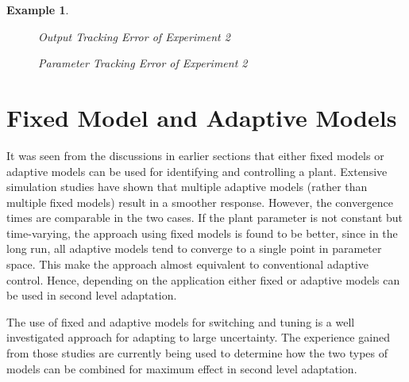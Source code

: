 \documentclass[conference]{IEEEtran}
\newtheorem{Example}{Example}
\begin{document}
\begin{Example}
\begin{figure}[H]
\centering
{}
\caption{Output Tracking Error of Experiment 2}
\end{figure}

\begin{figure}[H]
\centering
{}
\caption{Parameter Tracking Error of Experiment 2}
\end{figure}



\end{Example}




\section{Fixed Model and Adaptive Models}
It was seen from the discussions in earlier sections that either fixed models or adaptive models can be used for identifying and controlling a plant. Extensive simulation studies have shown that multiple adaptive models (rather than multiple fixed models) result in a smoother response. However, the convergence times are comparable in the two cases. If the plant parameter is not constant but time-varying, the approach using fixed models is found to be better, since in the long run, all adaptive models tend to converge to a single point in parameter space. This make the approach almost equivalent to conventional adaptive control. Hence, depending on the application either fixed or adaptive models can be used in second level adaptation.

The use of fixed and adaptive models for switching and tuning is a well investigated approach for adapting to large uncertainty. The experience gained from those studies are currently being used to determine how the two types of models can be combined for maximum effect in second level adaptation.
\end{document}
